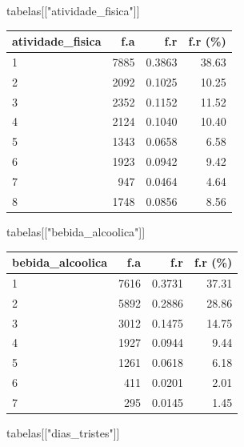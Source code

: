 \documentclass[
]{article}
\newenvironment{Shaded}{\begin{snugshade}}{\end{snugshade}}
\newcommand{\NormalTok}[1]{\textcolor[rgb]{0.00,0.23,0.31}{#1}}
\newcommand{\StringTok}[1]{\textcolor[rgb]{0.13,0.47,0.30}{#1}}
\begin{document}
\begin{Shaded}
\begin{Highlighting}[]
\NormalTok{tabelas[[}\StringTok{"atividade\_fisica"}\NormalTok{]]}
\end{Highlighting}
\end{Shaded}

\begin{longtable}[]{@{}lrrr@{}}
\toprule()
atividade\_fisica & f.a & f.r & f.r (\%) \\
\midrule()
\endhead
1 & 7885 & 0.3863 & 38.63 \\
2 & 2092 & 0.1025 & 10.25 \\
3 & 2352 & 0.1152 & 11.52 \\
4 & 2124 & 0.1040 & 10.40 \\
5 & 1343 & 0.0658 & 6.58 \\
6 & 1923 & 0.0942 & 9.42 \\
7 & 947 & 0.0464 & 4.64 \\
8 & 1748 & 0.0856 & 8.56 \\
\bottomrule()
\end{longtable}

\begin{Shaded}
\begin{Highlighting}[]
\NormalTok{tabelas[[}\StringTok{"bebida\_alcoolica"}\NormalTok{]]}
\end{Highlighting}
\end{Shaded}

\begin{longtable}[]{@{}lrrr@{}}
\toprule()
bebida\_alcoolica & f.a & f.r & f.r (\%) \\
\midrule()
\endhead
1 & 7616 & 0.3731 & 37.31 \\
2 & 5892 & 0.2886 & 28.86 \\
3 & 3012 & 0.1475 & 14.75 \\
4 & 1927 & 0.0944 & 9.44 \\
5 & 1261 & 0.0618 & 6.18 \\
6 & 411 & 0.0201 & 2.01 \\
7 & 295 & 0.0145 & 1.45 \\
\bottomrule()
\end{longtable}

\begin{Shaded}
\begin{Highlighting}[]
\NormalTok{tabelas[[}\StringTok{"dias\_tristes"}\NormalTok{]]}
\end{Highlighting}
\end{Shaded}
\end{document}
